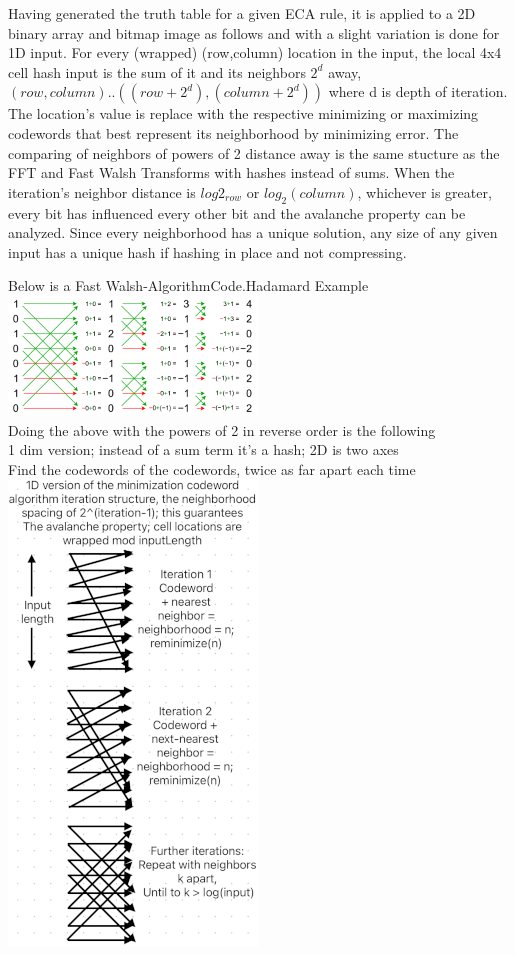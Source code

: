 \documentclass[11pt]{article}
\begin{document}
Having generated the truth table for a given ECA rule, it is applied to a 2D binary array and bitmap image as follows and with a slight variation is done for 1D input. For every (wrapped) (row,column) location in the input, the local 4x4 cell hash input is the sum of it and its neighbors $2^d$ away, $(row,column)..((row+2^d),(column+2^d))$ where d is depth of iteration. The location's value is replace with the respective minimizing or maximizing codewords that best represent its neighborhood by minimizing error. The comparing of neighbors of powers of 2 distance away is the same stucture as the FFT and Fast Walsh Transforms with hashes instead of sums. When the iteration's neighbor distance is $log2_{row}$ or $log_2(column)$, whichever is greater, every bit has influenced every other bit and the avalanche property can be analyzed. Since every neighborhood has a unique solution, any size of any given input has a unique hash if hashing in place and not compressing.\\

\begin{center}
Below is a Fast Walsh-AlgorithmCode.Hadamard Example \cite{enwiki:1261916659}\\
\includegraphics{FastWalshHadamard}\\

Doing the above with the powers of 2 in reverse order is the following\\
1 dim version; instead of a sum term it's a hash; 2D is two axes\\ 
Find the codewords of the codewords, twice as far apart each time\\
\includegraphics{AlgoStruct}\\
\end{center}
\end{document}
